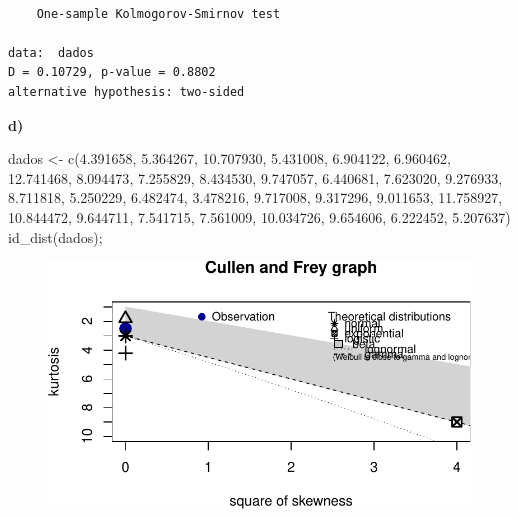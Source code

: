 \documentclass[
  letterpaper,
  DIV=11,
  numbers=noendperiod]{scrartcl}
\newenvironment{Shaded}{\begin{snugshade}}{\end{snugshade}}
\newcommand{\FloatTok}[1]{\textcolor[rgb]{0.68,0.00,0.00}{#1}}
\newcommand{\FunctionTok}[1]{\textcolor[rgb]{0.28,0.35,0.67}{#1}}
\newcommand{\NormalTok}[1]{\textcolor[rgb]{0.00,0.23,0.31}{#1}}
\newcommand{\OtherTok}[1]{\textcolor[rgb]{0.00,0.23,0.31}{#1}}
\begin{document}
\begin{verbatim}

    One-sample Kolmogorov-Smirnov test

data:  dados
D = 0.10729, p-value = 0.8802
alternative hypothesis: two-sided
\end{verbatim}

\textbf{d)}

\begin{Shaded}
\begin{Highlighting}[]
\NormalTok{dados }\OtherTok{\textless{}{-}} \FunctionTok{c}\NormalTok{(}\FloatTok{4.391658}\NormalTok{, }\FloatTok{5.364267}\NormalTok{, }\FloatTok{10.707930}\NormalTok{, }\FloatTok{5.431008}\NormalTok{, }\FloatTok{6.904122}\NormalTok{, }\FloatTok{6.960462}\NormalTok{, }\FloatTok{12.741468}\NormalTok{, }\FloatTok{8.094473}\NormalTok{, }\FloatTok{7.255829}\NormalTok{, }\FloatTok{8.434530}\NormalTok{, }\FloatTok{9.747057}\NormalTok{, }\FloatTok{6.440681}\NormalTok{, }\FloatTok{7.623020}\NormalTok{, }\FloatTok{9.276933}\NormalTok{, }\FloatTok{8.711818}\NormalTok{, }\FloatTok{5.250229}\NormalTok{, }\FloatTok{6.482474}\NormalTok{, }\FloatTok{3.478216}\NormalTok{, }\FloatTok{9.717008}\NormalTok{, }\FloatTok{9.317296}\NormalTok{, }\FloatTok{9.011653}\NormalTok{, }\FloatTok{11.758927}\NormalTok{, }\FloatTok{10.844472}\NormalTok{, }\FloatTok{9.644711}\NormalTok{, }\FloatTok{7.541715}\NormalTok{, }\FloatTok{7.561009}\NormalTok{, }\FloatTok{10.034726}\NormalTok{, }\FloatTok{9.654606}\NormalTok{, }\FloatTok{6.222452}\NormalTok{, }\FloatTok{5.207637}\NormalTok{)}
\FunctionTok{id\_dist}\NormalTok{(dados);}
\end{Highlighting}
\end{Shaded}

\begin{figure}[H]

{\centering \includegraphics{quiz5_files/figure-pdf/unnamed-chunk-37-1.pdf}

}

\end{figure}
\end{document}
